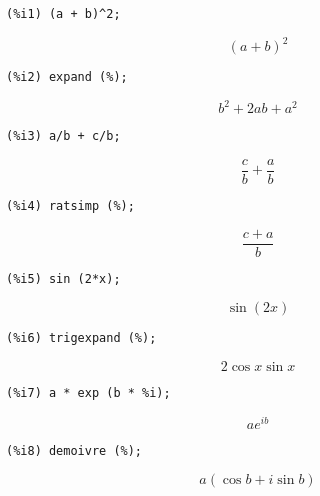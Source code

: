\documentclass[12pt,leqno]{article}
\begin{document}
\begin{enumerate}
\begin{verbatim}
(%i1) (a + b)^2;
\end{verbatim}
\begin{dmath}[number={\(\mathop{\mathrm{\%o}_{1}}\)}]
{\left(a+b\right)}^{2}
\end{dmath}
\begin{verbatim}
(%i2) expand (%);
\end{verbatim}
\begin{dmath}[number={\(\mathop{\mathrm{\%o}_{2}}\)}]
{b}^{2}+2 a b+{a}^{2}
\end{dmath}
\begin{verbatim}
(%i3) a/b + c/b;
\end{verbatim}
\begin{dmath}[number={\(\mathop{\mathrm{\%o}_{3}}\)}]
\frac{c}{b}+\frac{a}{b}
\end{dmath}
\begin{verbatim}
(%i4) ratsimp (%);
\end{verbatim}
\begin{dmath}[number={\(\mathop{\mathrm{\%o}_{4}}\)}]
\frac{c+a}{b}
\end{dmath}
\begin{verbatim}
(%i5) sin (2*x);
\end{verbatim}
\begin{dmath}[number={\(\mathop{\mathrm{\%o}_{5}}\)}]
\sin \left(2 x\right)
\end{dmath}
\begin{verbatim}
(%i6) trigexpand (%);
\end{verbatim}
\begin{dmath}[number={\(\mathop{\mathrm{\%o}_{6}}\)}]
2 \cos x \sin x
\end{dmath}
\begin{verbatim}
(%i7) a * exp (b * %i);
\end{verbatim}
\begin{dmath}[number={\(\mathop{\mathrm{\%o}_{7}}\)}]
a {e}^{i b}
\end{dmath}
\begin{verbatim}
(%i8) demoivre (%);
\end{verbatim}
\begin{dmath}[number={\(\mathop{\mathrm{\%o}_{8}}\)}]
a \left(\cos b+i \sin b\right)
\end{dmath}


\end{enumerate}
\end{document}
